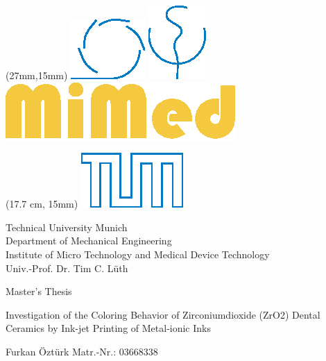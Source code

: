 \thispagestyle{plain}


\begin{textblock*}{9 cm}(27mm,15mm)
\includegraphics[valign=t]{grafiken/MW_CMYK.eps}
\hspace{5 mm}
\includegraphics[valign=t]{grafiken/MED_CMYK.eps}
\hspace{5 mm}
\includegraphics[valign=t]{grafiken/MiMed.eps}
\end{textblock*}

\begin{textblock*}{2 cm}(17.7 cm, 15mm)
\includegraphics[]{grafiken/TUMLogo_oZ_Outline_blau_CMYK.eps}
\end{textblock*}

\hspace{5 mm}

\begin{center}
\begin{singlespace}
\small Technical University Munich\smallskip\\
Department of Mechanical Engineering\smallskip\\
Institute of Micro Technology and Medical Device Technology\smallskip\\
Univ.-Prof. Dr. Tim C. Lüth
\end{singlespace}
\end{center}
\vspace{0.8 cm}
\begin{center}
{\large Master's Thesis}
\end{center}
\vspace{0.70 cm}
\begin{center}
{\Large Investigation of the Coloring Behavior of Zirconiumdioxide (ZrO2) Dental Ceramics by Ink-jet Printing of Metal-ionic Inks}
\end{center}
\vspace{0.70 cm}
\begin{center}
{\large Furkan Öztürk\nl
Matr.-Nr.: 03668338}
\end{center}

